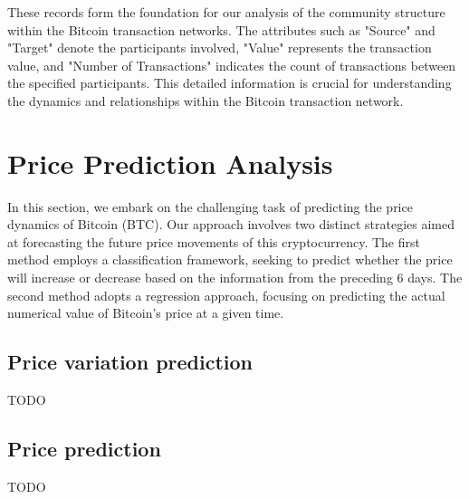 \documentclass[a4paper, 12pt]{article}
\begin{document}
These records form the foundation for our analysis of the community structure within the Bitcoin transaction networks. The attributes such as "Source" and "Target" denote the participants involved, "Value" represents the transaction value, and "Number of Transactions" indicates the count of transactions between the specified participants. This detailed information is crucial for understanding the dynamics and relationships within the Bitcoin transaction network.

\newpage

\section{Price Prediction Analysis}

In this section, we embark on the challenging task of predicting the price dynamics of Bitcoin (BTC). Our approach involves two distinct strategies aimed at forecasting the future price movements of this cryptocurrency. The first method employs a classification framework, seeking to predict whether the price will increase or decrease based on the information from the preceding 6 days. The second method adopts a regression approach, focusing on predicting the actual numerical value of Bitcoin's price at a given time.

\subsection{Price variation prediction}
TODO

\subsection{Price prediction}
TODO

\newpage
\end{document}
